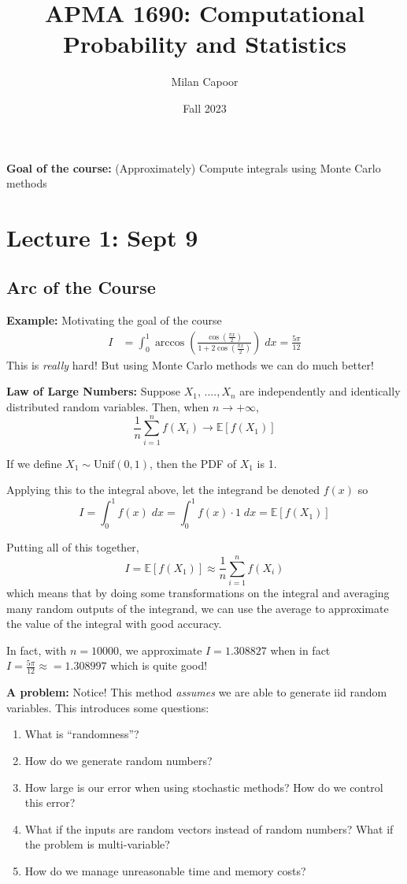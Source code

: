 \documentclass[12pt]{article}
\title{APMA 1690: Computational Probability and Statistics}
\author{Milan Capoor}
\date{Fall 2023}
\newcommand{\E}{\mathbb{E}}
\begin{document}
\maketitle
\textbf{Goal of the course:} (Approximately) Compute integrals using Monte Carlo methods

\section*{Lecture 1: Sept 9}
\subsection*{Arc of the Course}
\textbf{Example:} Motivating the goal of the course
\begin{align*}
    I &= \int_0^1 \arccos \left(\frac{\cos(\frac{\pi x}{2})}{1 + 2\cos(\frac{\pi x}{2})}\right)\; dx = \frac{5\pi}{12}
\end{align*}
This is \emph{really} hard! But using Monte Carlo methods we can do much better!

\textbf{Law of Large Numbers:} Suppose $X_1, \, ...., X_n$ are independently and identically distributed random variables. Then, when $n \to +\infty$,
\[\frac{1}{n}\sum_{i=1}^n f(X_i) \to \E [f(X_1)]\]

If we define $X_1 \sim \text{Unif}(0, 1)$, then the PDF of $X_1$ is 1. 

Applying this to the integral above, let the integrand be denoted $f(x)$ so 
\[I = \int_0^1 f(x)\; dx = \int_0^1 f(x) \cdot 1 \; dx = \E [f(X_1)]\]

Putting all of this together, 
\[I = \E[f(X_1)] \approx \frac{1}{n} \sum_{i=1}^n f(X_i)\]
which means that by doing some transformations on the integral and averaging many random outputs of the integrand, we can use the average to approximate the value of the integral with good accuracy. 

In fact, with $n=10000$, we approximate $I = 1.308827$ when in fact $I = \frac{5\pi}{12} \approx = 1.308997$ which is quite good!

\textbf{A problem:} Notice! This method \emph{assumes} we are able to generate iid random variables. This introduces some questions:
\begin{enumerate}
    \item What is ``randomness''?
    \item How do we generate random numbers?
    \item How large is our error when using stochastic methods? How do we control this error?
    \item What if the inputs are random vectors instead of random numbers? What if the problem is multi-variable?
    \item How do we manage unreasonable time and memory costs?
\end{enumerate}
\end{document}
